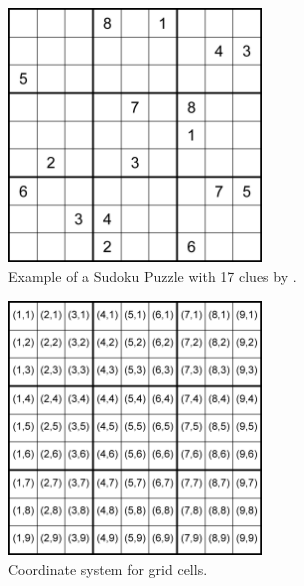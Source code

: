 \begin{figure}
\centering
\includegraphics[width=0.6\textwidth]{Figures/17-clue sudoku puzzle (McGuire).png}
\caption{Example of a Sudoku Puzzle with 17 clues by \citet{https://doi.org/10.48550/arxiv.1201.0749}.}
\label{fig:exampleSudoku}
\end{figure}

\begin{figure}
\centering
\includegraphics[width=0.6\textwidth]{Figures/GridCoordinates.png}
\caption{Coordinate system for grid cells.}
\label{fig:GridCoordinates}
\end{figure}

